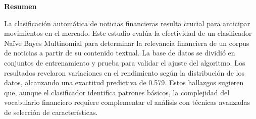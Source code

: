 \small
\noindent\textbf{Resumen}

La clasificación automática de noticias financieras resulta crucial para anticipar 
movimientos en el mercado. Este estudio evalúa la efectividad de un clasificador 
Naïve Bayes Multinomial para determinar la relevancia financiera de un corpus de 
noticias a partir de su contenido textual. La base de datos se dividió en conjuntos 
de entrenamiento y prueba para validar el ajuste del algoritmo. Los resultados 
revelaron variaciones en el rendimiento según la distribución de los datos, alcanzando 
una exactitud predictiva de 0.579. Estos hallazgos sugieren que, aunque el clasificador 
identifica patrones básicos, la complejidad del vocabulario financiero requiere 
complementar el análisis con técnicas avanzadas de selección de características.